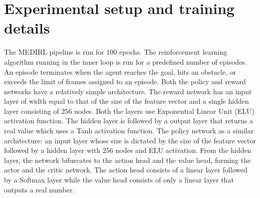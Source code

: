 \section{Experimental setup and training details}
\label{sec:exp-setup}
 The MEDIRL pipeline is run for $100$ epochs. The reinforcement learning algorithm \cite{mnih_actor_critic_2016} running in the inner loop is run for a predefined number of episodes. An episode terminates when the agent reaches the goal, hits an obstacle, or exceeds the limit of frames assigned to an episode. Both the policy and reward networks have a relatively simple architecture. The reward network has an input layer of width equal to that of the size of the feature vector and a single hidden layer consisting of $256$ nodes. Both the layers use Exponential Linear Unit (ELU) \cite{elu} activation function. The hidden layer is followed by a output layer that returns a real value which uses a Tanh activation function. The policy network as a similar architecture: an input layer whose size is dictated by the size of the feature vector followed by a hidden layer with $256$ nodes and ELU activation. From the hidden layer, the network bifurcates to the action head and the value head, forming the actor and the critic network. The action head consists of a linear layer followed by a Softmax layer while the value head consists of only a linear layer that outputs a real number.


